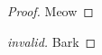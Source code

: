 \documentclass{article}
\begin{document}
%

\begin{proof}
  Meow
\end{proof}

\begin{proof}[invalid]
  Bark
\end{proof}
\end{document}
